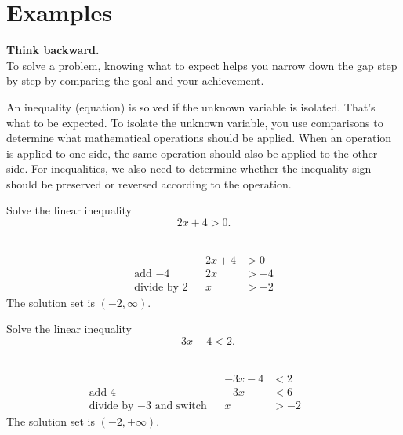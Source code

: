 \documentclass[
  en,11pt]{elegantbook}
\newcommand{\size}[2]{{\fontsize{#1}{0}\selectfont#2}}
\newenvironment{rmdtip}{
	\vspace*{0.5\baselineskip}
	\par\noindent
	\makebox[-3pt][r]{\color{red!90}\size{12}{\HandRight}\,\,}
    \begin{tcolorbox}[
    enhanced,
    title={\textbf{\color{second}Tips}},
    title style={left color=blue!10!green!20!white,right color=yellow!20!blue!20!white},
    colback=cyan!10!white,
    ]
    \sffamily
}{
    \end{tcolorbox}
    \par\ignorespacesafterend
}
\let\BeginKnitrBlock\begin \let\EndKnitrBlock\end
\begin{document}
\hypertarget{examples}{%
\section{Examples}\label{examples}}

\begin{rmdtip}

\textbf{Think backward.}\\
To solve a problem, knowing what to expect helps you narrow down the gap step by step by comparing the goal and your achievement.

An inequality (equation) is solved if the unknown variable is isolated. That's what to be expected. To isolate the unknown variable, you use comparisons to determine what mathematical operations should be applied. When an operation is applied to one side, the same operation should also be applied to the other side. For inequalities, we also need to determine whether the inequality sign should be preserved or reversed according to the operation.

\end{rmdtip}

\BeginKnitrBlock{example}
\protect\hypertarget{exm:unnamed-chunk-194}{}{\label{exm:unnamed-chunk-194} }
Solve the linear inequality
\[
2x+4>0.
\]
\EndKnitrBlock{example}

\BeginKnitrBlock{solution}
{}\\

\[
\begin{aligned}
&  & 2x+4 & >0  \\
    \text{add $-4$}      &  & 2x   & >-4 \\
    \text{divide by $2$} &  & x    & >-2
\end{aligned}
\]
The solution set is \((-2, \infty)\).
\EndKnitrBlock{solution}

\BeginKnitrBlock{example}
\protect\hypertarget{exm:unnamed-chunk-196}{}{\label{exm:unnamed-chunk-196} }
Solve the linear inequality
\[
-3x-4<2.
\]
\EndKnitrBlock{example}

\BeginKnitrBlock{solution}
{}\\

\[
\begin{aligned}
                                        &  & -3x-4 & <2       \\
    \text{add $4$}                   &  & -3x   & <6  &  & \\
    \text{divide by $-3$ and switch} &  & x     & >-2
\end{aligned}
\]
The solution set is \((-2, +\infty)\).
\EndKnitrBlock{solution}
\end{document}
